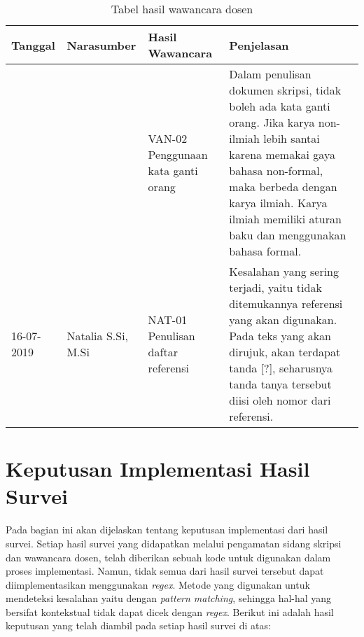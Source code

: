\begin{table}[H]
	\renewcommand{\arraystretch}{1.5}
	\caption {Tabel hasil wawancara dosen} \label{tab:hasil_wawancara3}
	\begin{center}
		\begin{tabular}{|p{2 cm}|>{\raggedright} p{3.5 cm}| p{4 cm}| p{5 cm}|}
		\hline
		Tanggal & Narasumber & Hasil Wawancara & Penjelasan \\ 
		\hline
		 & & VAN-02 \newline Penggunaan kata ganti orang & Dalam penulisan dokumen skripsi, tidak boleh ada kata ganti orang. Jika karya non-ilmiah lebih santai karena memakai gaya bahasa non-formal, maka berbeda dengan karya ilmiah. Karya ilmiah memiliki aturan baku dan menggunakan bahasa formal.  \newline \\ 		
		 \hline
		16-07-2019 & Natalia S.Si, M.Si & NAT-01 \newline Penulisan daftar referensi & Kesalahan yang sering terjadi, yaitu tidak ditemukannya referensi yang akan digunakan. Pada teks yang akan dirujuk, akan terdapat tanda [?], seharusnya tanda tanya tersebut diisi oleh nomor dari referensi. \newline \\ 
		\hline
		\end{tabular}
	\end{center}
\end{table}

\section{Keputusan Implementasi Hasil Survei}

Pada bagian ini akan dijelaskan tentang keputusan implementasi dari hasil survei. Setiap hasil survei yang didapatkan melalui pengamatan sidang skripsi dan wawancara dosen, telah diberikan sebuah kode untuk digunakan dalam proses implementasi. Namun, tidak semua dari hasil survei tersebut dapat diimplementasikan menggunakan \textit{regex}. Metode yang digunakan untuk mendeteksi kesalahan yaitu dengan \textit{pattern matching}, sehingga hal-hal yang bersifat kontekstual tidak dapat dicek dengan \textit{regex}. Berikut ini adalah hasil keputusan yang telah diambil pada setiap hasil survei di atas:

